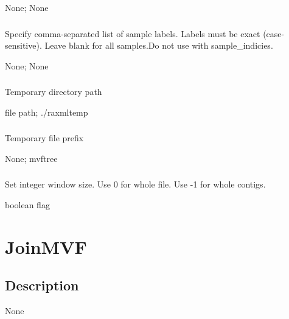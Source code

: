 \documentclass[letterpaper,11pt,english]{sphinxmanual}
\begin{document}
 None;  None


\subsubsection{}
\label{\detokenize{prog_desc:id126}}
 Specify comma-separated list of sample labels. Labels must be exact (case-sensitive). Leave blank for all samples.Do not use with \textendash{}sample\_indicies.

 None;  None


\subsubsection{}
\label{\detokenize{prog_desc:id127}}
 Temporary directory path

 file path;  ./raxmltemp


\subsubsection{}
\label{\detokenize{prog_desc:temp-prefix-tempprefix}}
 Temporary file prefix

 None;  mvftree


\subsubsection{}
\label{\detokenize{prog_desc:id128}}
 Set integer window size. Use 0 for whole file. Use -1 for whole contigs.

 boolean flag


\section{JoinMVF}
\label{\detokenize{prog_desc:joinmvf}}

\subsection{Description}
\label{\detokenize{prog_desc:id129}}
None
\end{document}
